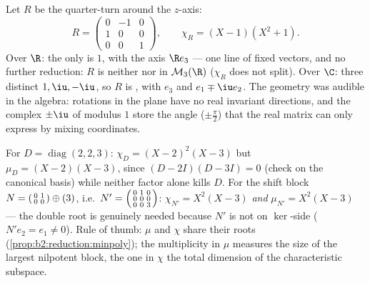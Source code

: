 \begin{example}\label{ex:b2:reduction:rotation3d}
Let $R$ be the quarter-turn around the $z$-axis:
\[
R = \begin{pmatrix}
0 & -1 & 0\\
1 & 0 & 0\\
0 & 0 & 1
\end{pmatrix},
\qquad
\chi_R = (X - 1)(X^2 + 1).
\]
Over $\R$: the only  is $1$, with  the axis
$\R e_3$ --- one line of fixed vectors, and no further
reduction: $R$ is neither  nor  in
$\mathcal{M}_3(\R)$ ($\chi_R$ does not split). Over $\C$: three
distinct  $1, \iu, -\iu$, so $R$ is ,
with  $e_3$ and $e_1 \mp \iu e_2$. The geometry was
audible in the algebra: rotations in the plane have no real
invariant directions, and the complex  $\pm\iu$ of
modulus $1$ store the angle ($\pm\frac\pi2$) that the real
matrix can only express by mixing coordinates.
\end{example}

\begin{example}\label{ex:b2:reduction:minvschar}
For $D = \operatorname{diag}(2, 2, 3)$: $\chi_D = (X - 2)^2(X -
3)$ but $\mu_D = (X - 2)(X - 3)$, since $(D - 2I)(D - 3I) = 0$
(check on the canonical basis) while neither factor alone kills
$D$. For the shift block $N = \begin{psmallmatrix}0 & 1\\ 0 &
0\end{psmallmatrix} \oplus (3)$, i.e.\ $N' =
\begin{psmallmatrix}0 & 1 & 0\\ 0 & 0 & 0\\ 0 & 0 &
3\end{psmallmatrix}$: $\chi_{N'} = X^2(X - 3)$ \emph{and}
$\mu_{N'} = X^2(X - 3)$ --- the double root is genuinely needed
because $N'$ is not  on $\ker$-side ($N'e_2 =
e_1 \neq 0$). Rule of thumb: $\mu$ and $\chi$ share their roots
(\cref{prop:b2:reduction:minpoly}); the multiplicity in $\mu$
measures the size of the largest nilpotent block, the one in
$\chi$ the total dimension of the characteristic subspace.
\end{example}

